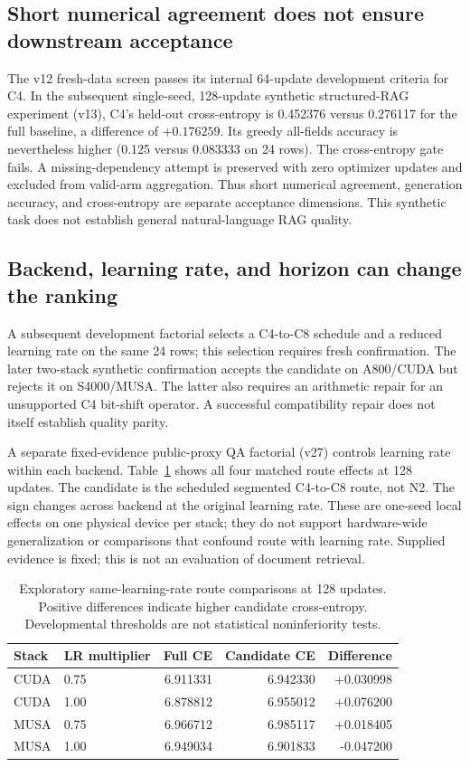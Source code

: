\documentclass[10pt]{article}
\begin{document}
\subsection{Short numerical agreement does not ensure downstream acceptance}
The v12 fresh-data screen passes its internal 64-update development criteria for C4. In the subsequent single-seed, 128-update synthetic structured-RAG experiment (v13), C4's held-out cross-entropy is 0.452376 versus 0.276117 for the full baseline, a difference of $+0.176259$. Its greedy all-fields accuracy is nevertheless higher (0.125 versus 0.083333 on 24 rows). The cross-entropy gate fails. A missing-dependency attempt is preserved with zero optimizer updates and excluded from valid-arm aggregation. Thus short numerical agreement, generation accuracy, and cross-entropy are separate acceptance dimensions. This synthetic task does not establish general natural-language RAG quality.

\subsection{Backend, learning rate, and horizon can change the ranking}
A subsequent development factorial selects a C4-to-C8 schedule and a reduced learning rate on the same 24 rows; this selection requires fresh confirmation. The later two-stack synthetic confirmation accepts the candidate on A800/CUDA but rejects it on S4000/MUSA. The latter also requires an arithmetic repair for an unsupported C4 bit-shift operator. A successful compatibility repair does not itself establish quality parity.

A separate fixed-evidence public-proxy QA factorial (v27) controls learning rate within each backend. Table~\ref{tab:later} shows all four matched route effects at 128 updates. The candidate is the scheduled segmented C4-to-C8 route, not N2. The sign changes across backend at the original learning rate. These are one-seed local effects on one physical device per stack; they do not support hardware-wide generalization or comparisons that confound route with learning rate. Supplied evidence is fixed; this is not an evaluation of document retrieval.
\begin{table}[ht]
\centering
\begin{tabular}{llrrr}
\toprule Stack & LR multiplier & Full CE & Candidate CE & Difference\\\midrule
CUDA & 0.75 & 6.911331 & 6.942330 & +0.030998\\
CUDA & 1.00 & 6.878812 & 6.955012 & +0.076200\\
MUSA & 0.75 & 6.966712 & 6.985117 & +0.018405\\
MUSA & 1.00 & 6.949034 & 6.901833 & -0.047200\\\bottomrule
\end{tabular}
\caption{Exploratory same-learning-rate route comparisons at 128 updates. Positive differences indicate higher candidate cross-entropy. Developmental thresholds are not statistical noninferiority tests.}
\label{tab:later}
\end{table}
\end{document}
